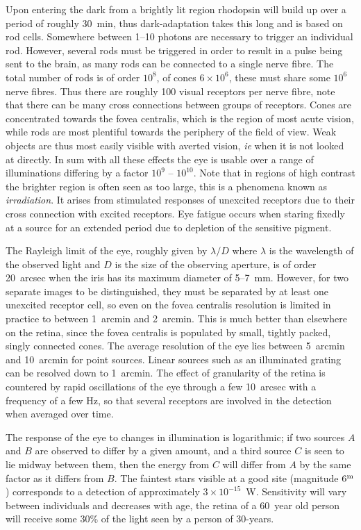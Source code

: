 Upon entering the dark from a brightly lit region rhodopsin will build
up over a period of roughly 30~min, thus dark-adaptation takes this
long and is based on rod cells. Somewhere between 1--10 photons are
necessary to trigger an individual rod. However, several rods must be
triggered in order to result in a pulse being sent to the brain, as
many rods can be connected to a single nerve fibre. The total number
of rods is of order $10^8$, of cones $6\times 10^6$, these must share
some $10^6$ nerve fibres. Thus there are roughly 100 visual receptors
per nerve fibre, note that there can be many cross connections between
groups of receptors. Cones are concentrated towards the fovea
centralis, which is the region of most acute vision, while rods are
most plentiful towards the periphery of the field of view. Weak
objects are thus most easily visible with averted vision, {\it ie}
when it is not looked at directly. In sum with all these effects the
eye is usable over a range of illuminations differing by a factor
$10^9$ -- $10^{10}$. Note that in regions of high contrast the
brighter region is often seen as too large, this is a phenomena known
as {\it irradiation}. It arises from stimulated responses of unexcited
receptors due to their cross connection with excited receptors. Eye
fatigue occurs when staring fixedly at a source for an extended period
due to depletion of the sensitive pigment.

The Rayleigh limit of the eye, roughly given by $\lambda/D$ where
$\lambda$ is the wavelength of the observed light and $D$ is the size
of the observing aperture, is of order 20~arcsec when the iris has
its maximum diameter of 5--7~mm. However, for two separate images to
be distinguished, they must be separated by at least one unexcited 
receptor cell, so even on the fovea centralis resolution is limited in
practice to between 1~arcmin and 2~arcmin. This is much better than
elsewhere on the retina, since the fovea centralis is populated by
small, tightly packed, singly connected cones. The average resolution
of the eye lies between 5~arcmin and 10~arcmin for point sources. Linear
sources such as an illuminated grating can be resolved down to 1~arcmin.  
The effect of granularity of the retina is countered by rapid oscillations of the
eye through a few 10~arcsec with a frequency of a few Hz, so that
several receptors are involved in the detection when averaged over
time.

The response of the eye to changes in illumination is logarithmic; if
two sources $A$ and $B$ are observed to differ by a given amount, and a
third source $C$ is seen to lie midway between them, then the energy
from $C$ will differ from $A$ by the same factor as it differs from
$B$. The faintest stars visible at a good site (magnitude $6^{\rm m}$)
corresponds to a detection of approximately $3\times
10^{-15}$~W. Sensitivity will vary between individuals and decreases
with age, the retina of a 60~year old person will receive some 30\% of 
the light seen by a person of 30-years.

